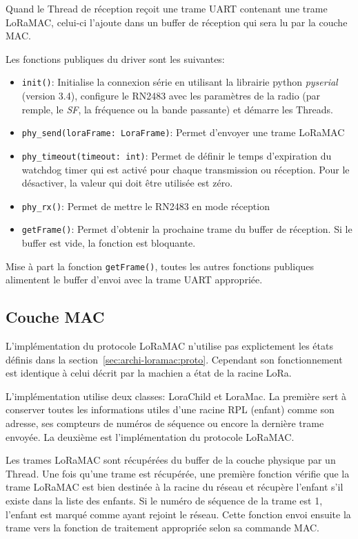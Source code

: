     Quand le Thread de réception reçoit une trame UART contenant une trame LoRaMAC, celui-ci l'ajoute dans un buffer de réception qui sera lu par la couche MAC.

    Les fonctions publiques du driver sont les suivantes:
    \begin{itemize}
        \item \texttt{init()}: Initialise la connexion série en utilisant la librairie python \textit{pyserial} (version 3.4), configure le RN2483 avec les paramètres de la radio (par remple, le \textit{SF}, la fréquence ou la bande passante) et démarre les Threads.
        \item \texttt{phy\_send(loraFrame: LoraFrame)}: Permet d'envoyer une trame LoRaMAC
        \item \texttt{phy\_timeout(timeout: int)}: Permet de définir le temps d'expiration du watchdog timer qui est activé pour chaque transmission ou réception. Pour le désactiver, la valeur qui doit être utilisée est zéro.
        \item \texttt{phy\_rx()}: Permet de mettre le RN2483 en mode réception
        \item \texttt{getFrame()}: Permet d'obtenir la prochaine trame du buffer de réception. Si le buffer est vide, la fonction est bloquante.
    \end{itemize}

    Mise à part la fonction \texttt{getFrame()}, toutes les autres fonctions publiques alimentent le buffer d'envoi avec la trame UART appropriée.

\subsection*{Couche MAC}
    L'implémentation du protocole LoRaMAC n'utilise pas explictement les états définis dans la section~\ref{sec:archi-loramac:proto}. Cependant son fonctionnement est identique à celui décrit par la machien a état de la racine LoRa.
    
    L'implémentation utilise deux classes: LoraChild et LoraMac. La première 
    sert à conserver toutes les informations utiles d'une racine RPL (enfant) comme son adresse, 
    ses compteurs de numéros de séquence ou encore la dernière trame envoyée.
    La deuxième est l'implémentation du protocole LoRaMAC.

    Les trames LoRaMAC sont récupérées du buffer de la couche physique par un Thread. Une fois 
    qu'une trame est récupérée, une première fonction vérifie que la trame LoRaMAC est bien 
    destinée à la racine du réseau et récupère l'enfant s'il existe dans la liste des enfants. Si 
    le numéro de séquence de la trame est 1, l'enfant est marqué comme ayant rejoint le réseau. 
    Cette fonction envoi ensuite la trame vers la fonction de traitement appropriée selon sa 
    commande MAC.

